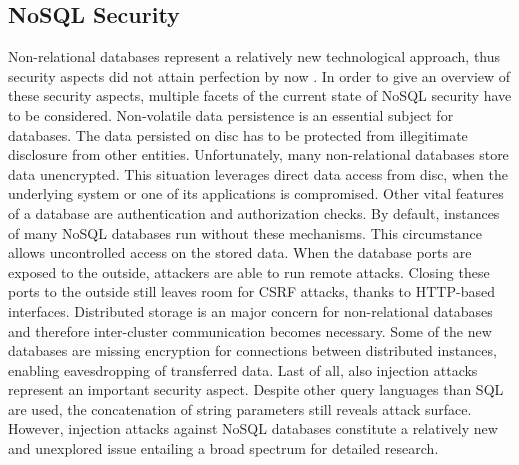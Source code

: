 \subsection{NoSQL Security}
Non-relational databases represent a relatively new technological approach, thus security aspects did not attain perfection by now \cite{Okman:2011, Noiumkar:2014}. In order to give an overview of these security aspects, multiple facets of the current state of NoSQL security have to be considered. Non-volatile data persistence is an essential subject for databases. The data persisted on disc has to be protected from illegitimate disclosure from other entities. Unfortunately, many non-relational databases store data unencrypted. This situation leverages direct data access from disc, when the underlying system or one of its applications is compromised. Other vital features of a database are authentication and authorization checks. By default, instances of many NoSQL databases run without these mechanisms. This circumstance allows uncontrolled access on the stored data. When the database ports are exposed to the outside, attackers are able to run remote attacks. Closing these ports to the outside still leaves room for CSRF attacks, thanks to HTTP-based interfaces. Distributed storage is an major concern for non-relational databases and therefore inter-cluster communication becomes necessary. Some of the new databases are missing encryption for connections between distributed instances, enabling eavesdropping of transferred data. Last of all, also injection attacks represent an important security aspect. Despite other query languages than SQL are used, the concatenation of string parameters still reveals attack surface. However, injection attacks against NoSQL databases constitute a relatively new and unexplored issue entailing a broad spectrum for detailed research.

